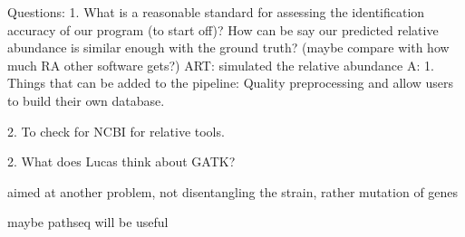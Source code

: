 Questions:
1. What is a reasonable standard for assessing the identification accuracy of our program (to start off)? How can be say our predicted relative abundance is similar enough with the ground truth? (maybe compare with how much RA other software gets?)
ART: simulated the relative abundance
A: 
1. Things that can be added to the pipeline: Quality preprocessing and allow users to build their own database.

2. To check for NCBI for relative tools.

2. What does Lucas think about GATK?

aimed at another problem, not disentangling the strain, rather mutation of genes

maybe pathseq will be useful



